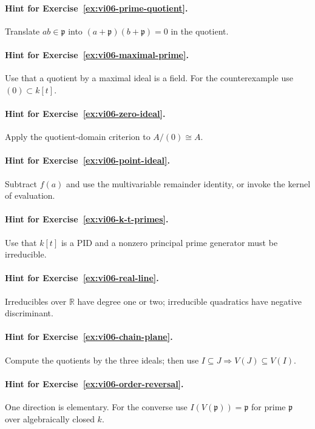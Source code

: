 \paragraph{Hint for Exercise~\ref{ex:vi06-prime-quotient}.} Translate $ab\in\mathfrak p$ into $(a+\mathfrak p)(b+\mathfrak p)=0$ in the quotient.

\paragraph{Hint for Exercise~\ref{ex:vi06-maximal-prime}.} Use that a quotient by a maximal ideal is a field. For the counterexample use $(0)\subset k[t]$.

\paragraph{Hint for Exercise~\ref{ex:vi06-zero-ideal}.} Apply the quotient-domain criterion to $A/(0)\cong A$.

\paragraph{Hint for Exercise~\ref{ex:vi06-point-ideal}.} Subtract $f(a)$ and use the multivariable remainder identity, or invoke the kernel of evaluation.

\paragraph{Hint for Exercise~\ref{ex:vi06-k-t-primes}.} Use that $k[t]$ is a PID and a nonzero principal prime generator must be irreducible.

\paragraph{Hint for Exercise~\ref{ex:vi06-real-line}.} Irreducibles over $\mathbb R$ have degree one or two; irreducible quadratics have negative discriminant.

\paragraph{Hint for Exercise~\ref{ex:vi06-chain-plane}.} Compute the quotients by the three ideals; then use $I\subseteq J\Rightarrow V(J)\subseteq V(I)$.

\paragraph{Hint for Exercise~\ref{ex:vi06-order-reversal}.} One direction is elementary. For the converse use $I(V(\mathfrak p))=\mathfrak p$ for prime $\mathfrak p$ over algebraically closed $k$.

